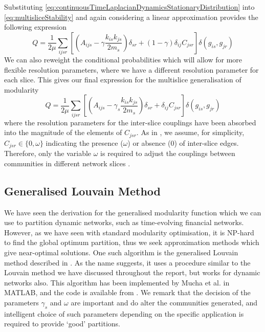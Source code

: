 Substituting \cref{eq:continuousTimeLaplacianDynamicsStationaryDistribution} into \cref{eq:multisliceStability} and again considering a linear approximation provides the following expression
\begin{equation}
	\label{eq:multisliceModularity}
	Q = \frac{1}{2\mu} \sum_{ijsr} \left[ \left( A_{ijs} - \gamma \frac{k_{is}k_{js}}{2m_{s}} \right) \delta_{sr} + (1-\gamma) \delta_{ij} C_{jsr} \right] \delta(g_{is},g_{jr})
\end{equation}
We can also reweight the conditional probabilities which will allow for more flexible resolution parameters, where we have a different resolution parameter for each slice.
This gives our final expression for the multislice generalisation of modularity
\begin{equation}
	\label{eq:multisliceModularityReweighted}
	Q = \frac{1}{2\mu} \sum_{ijsr} \left[ \left( A_{ijs} - \gamma_{s} \frac{k_{is}k_{js}}{2m_{s}} \right) \delta_{sr} + \delta_{ij} C_{jsr} \right] \delta(g_{is},g_{jr})
\end{equation}
where the resolution parameters for the inter-slice couplings have been absorbed into the magnitude of the elements of $C_{jsr}$.
As in \cite{MRM+10}, we assume, for simplicity, $C_{jsr} \in \{ 0,\omega \}$ indicating the presence ($\omega$) or absence (0) of inter-slice edges.
Therefore, only the variable $\omega$ is required to adjust the couplings between communities in different network slices \cite{BPW+13}.


\subsection{Generalised Louvain Method}
\label{subsec:generalisedLouvainMethod}

We have seen the derivation for the generalised modularity function which we can use to partition dynamic networks, such as time-evolving financial networks.
However, as we have seen with standard modularity optimisation, it is NP-hard to find the global optimum partition, thus we seek approximation methods which give near-optimal solutions.
One such algorithm is the generalised Louvain method described in \cite{MRM+10,MFF+11}.
As the name suggests, it uses a procedure similar to the Louvain method we have discussed throughout the report, but works for dynamic networks also.
This algorithm has been implemented by Mucha et al. in MATLAB, and the code is available from \cite{GenLou}.
We remark that the decision of the parameters $\gamma_{s}$ and $\omega$ are important and do alter the communities generated, and intelligent choice of such parameters depending on the specific application is required to provide `good' partitions.

